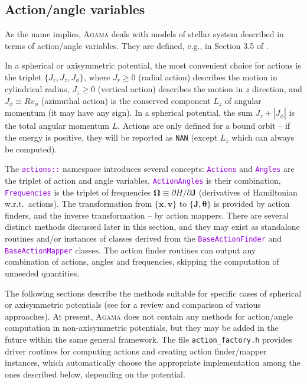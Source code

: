 \documentclass[12pt]{article}
\newcommand{\Agama}{\textsc{Agama}\xspace}
\newcommand{\ttt}[1]{\textcolor{darkviolet}{\texttt{#1}}}
\newcommand{\D}{\partial}
\newcommand{\bv}{\boldsymbol{v}}
\newcommand{\bx}{\boldsymbol{x}}
\newcommand{\bJ}{\boldsymbol{J}}
\newcommand{\bt}{\boldsymbol{\theta}}
\begin{document}
\subsection{Action/angle variables}  \label{sec:ActionAngle}

As the name implies, \Agama deals with models of stellar system described in terms of action/angle variables. They are defined, e.g., in Section 3.5 of \cite{BinneyTremaine}.

In a spherical or axisymmetric potential, the most convenient choice for actions is the triplet $\{J_r, J_z, J_\phi\}$, where $J_r\ge 0$ (radial action) describes the motion in cylindrical radius, $J_z\ge 0$ (vertical action) describes the motion in $z$ direction, and $J_\phi \equiv R v_\phi$ (azimuthal action) is the conserved component $L_z$ of angular momentum (it may have any sign). In a spherical potential, the sum $J_z + |J_\phi|$ is the total angular momentum $L$. Actions are only defined for a bound orbit -- if the energy is positive, they will be reported as \texttt{NAN} (except $L_z$ which can always be computed).

The \ttt{actions::} namespace introduces several concepts: \ttt{Actions} and \ttt{Angles} are the triplet of action and angle variables, \ttt{ActionAngles} is their combination, \ttt{Frequencies} is the triplet of frequencies $\boldsymbol{\Omega}\equiv \D H/\D \bJ$ (derivatives of Hamiltonian w.r.t.\ actions). 
The transformation from $\{\bx,\bv\}$ to $\{\bJ,\bt\}$ is provided by action finders, and the inverse transformation -- by action mappers. There are several distinct methods discussed later in this section, and they may exist as standalone routines and/or instances of classes derived from the \ttt{BaseActionFinder} and \ttt{BaseActionMapper} classes. The action finder routines can output any combination of actions, angles and frequencies, skipping the computation of unneeded quantities.

The following sections describe the methods suitable for specific cases of spherical or axisymmetric potentials (see \cite{SandersBinney2016} for a review and comparison of various approaches).
At present, \Agama does not contain any methods for action/angle computation in non\--axi\-sym\-met\-ric potentials, but they may be added in the future within the same general framework.
The file \texttt{action_factory.h} provides driver routines for computing actions and creating action finder/mapper instances, which automatically choose the appropriate implementation among the ones described below, depending on the potential.
\end{document}
